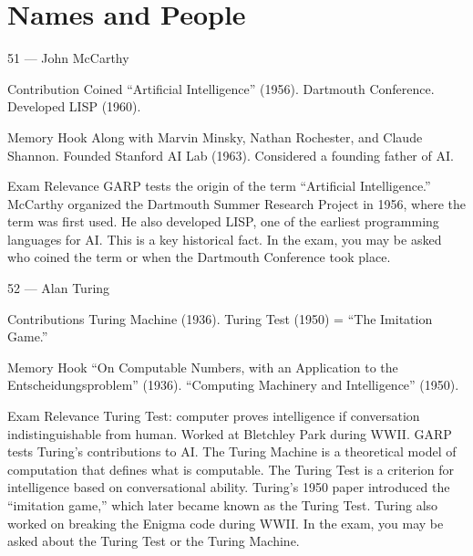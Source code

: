 \documentclass[aspectratio=169,8pt]{beamer}
\begin{document}
	\section{Names and People}
	
	\begin{frame}{51 --- John McCarthy}
		\begin{block}{Contribution}
			Coined ``Artificial Intelligence'' (1956). Dartmouth Conference. Developed LISP (1960).
		\end{block}
		\begin{block}{Memory Hook}
			Along with Marvin Minsky, Nathan Rochester, and Claude Shannon. Founded Stanford AI Lab (1963). Considered a founding father of AI.
		\end{block}
		\begin{block}{Exam Relevance}
			GARP tests the origin of the term ``Artificial Intelligence.'' McCarthy organized the Dartmouth Summer Research Project in 1956, where the term was first used. He also developed LISP, one of the earliest programming languages for AI. This is a key historical fact. In the exam, you may be asked who coined the term or when the Dartmouth Conference took place.
		\end{block}
	\end{frame}
	
	\begin{frame}{52 --- Alan Turing}
		\begin{block}{Contributions}
			Turing Machine (1936). Turing Test (1950) = ``The Imitation Game.''
		\end{block}
		\begin{block}{Memory Hook}
			``On Computable Numbers, with an Application to the Entscheidungsproblem'' (1936). ``Computing Machinery and Intelligence'' (1950).
		\end{block}
		\begin{block}{Exam Relevance}
			Turing Test: computer proves intelligence if conversation indistinguishable from human. Worked at Bletchley Park during WWII. GARP tests Turing's contributions to AI. The Turing Machine is a theoretical model of computation that defines what is computable. The Turing Test is a criterion for intelligence based on conversational ability. Turing's 1950 paper introduced the ``imitation game,'' which later became known as the Turing Test. Turing also worked on breaking the Enigma code during WWII. In the exam, you may be asked about the Turing Test or the Turing Machine.
		\end{block}
	\end{frame}
	
\end{document}
